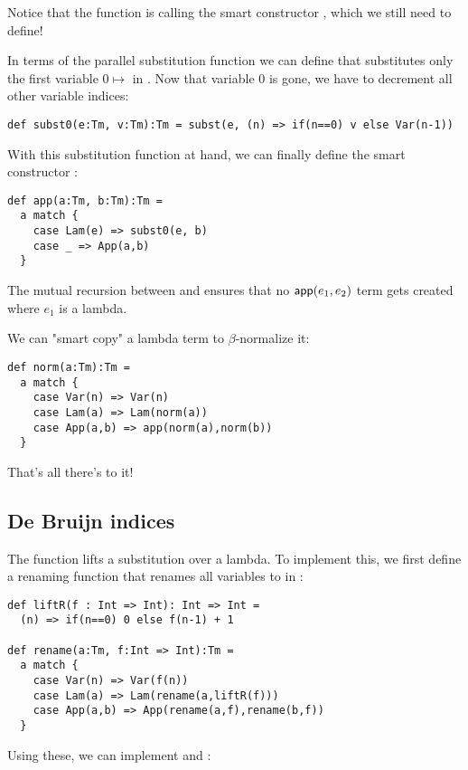 Notice that the  function is calling the smart constructor , which we still need to define!

In terms of the parallel substitution function  we can define  that substitutes only the first variable $0 \mapsto$  in .
Now that variable $0$ is gone, we have to decrement all other variable indices:

\begin{lstlisting}
def subst0(e:Tm, v:Tm):Tm = subst(e, (n) => if(n==0) v else Var(n-1))
\end{lstlisting}

With this substitution function at hand, we can finally define the smart constructor :

\begin{lstlisting}
def app(a:Tm, b:Tm):Tm =
  a match {
    case Lam(e) => subst0(e, b)
    case _ => App(a,b)
  }
\end{lstlisting}

The mutual recursion between  and  ensures that no $\mathsf{app}(e_1,e_2)$ term gets created where $e_1$ is a lambda.

We can "smart copy" a lambda term to $\beta$-normalize it:

\begin{lstlisting}
def norm(a:Tm):Tm =
  a match {
    case Var(n) => Var(n)
    case Lam(a) => Lam(norm(a))
    case App(a,b) => app(norm(a),norm(b))
  }
\end{lstlisting}

That's all there's to it!

\subsection{De Bruijn indices}

The  function lifts a substitution over a lambda.
To implement this, we first define a renaming function  that renames all variables  to  in :

\begin{lstlisting}
def liftR(f : Int => Int): Int => Int =
  (n) => if(n==0) 0 else f(n-1) + 1

def rename(a:Tm, f:Int => Int):Tm =
  a match {
    case Var(n) => Var(f(n))
    case Lam(a) => Lam(rename(a,liftR(f)))
    case App(a,b) => App(rename(a,f),rename(b,f))
  }
\end{lstlisting}

Using these, we can implement  and :

